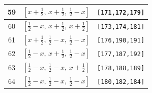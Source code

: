 \documentclass[fleqn,8pt]{jsarticle}
\begin{document}
\begin{longtable}{ccc}
59 & $\left[ x + \frac{1}{2},\, x + \frac{1}{2},\, \frac{1}{2} - x \right]$ & {\tt [171,172,179]} \\ \hline
60 & $\left[ \frac{1}{2} - x,\, x + \frac{1}{2},\, x + \frac{1}{2} \right]$ & {\tt [173,174,181]} \\ \hline
61 & $\left[ x + \frac{1}{2},\, \frac{1}{2} - x,\, \frac{1}{2} - x \right]$ & {\tt [176,190,191]} \\ \hline
62 & $\left[ \frac{1}{2} - x,\, x + \frac{1}{2},\, \frac{1}{2} - x \right]$ & {\tt [177,187,192]} \\ \hline
63 & $\left[ \frac{1}{2} - x,\, \frac{1}{2} - x,\, x + \frac{1}{2} \right]$ & {\tt [178,188,189]} \\ \hline
64 & $\left[ \frac{1}{2} - x,\, \frac{1}{2} - x,\, \frac{1}{2} - x \right]$ & {\tt [180,182,184]} \\
\end{longtable}
\renewcommand{\arraystretch}{1.2}
\end{document}
